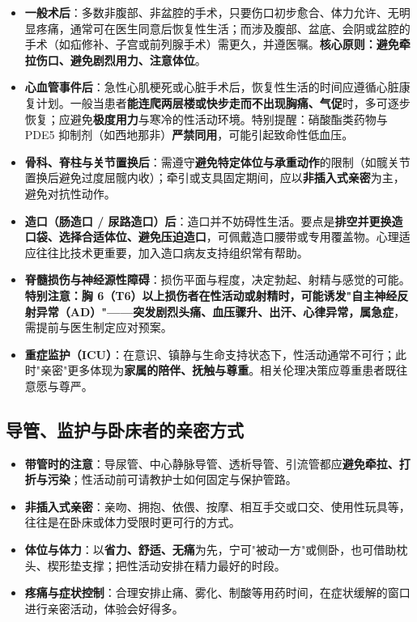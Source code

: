 \begin{itemize}
	\item \textbf{一般术后}：多数非腹部、非盆腔的手术，只要伤口初步愈合、体力允许、无明显疼痛，通常可在医生同意后恢复性生活；而涉及腹部、盆底、会阴或盆腔的手术（如疝修补、子宫或前列腺手术）需更久，并遵医嘱。\textbf{核心原则：避免牵拉伤口、避免剧烈用力、注意体位}。
	\item \textbf{心血管事件后}：急性心肌梗死或心脏手术后，恢复性生活的时间应遵循心脏康复计划。一般当患者\textbf{能连爬两层楼或快步走而不出现胸痛、气促}时，多可逐步恢复；应避免\textbf{极度用力}与寒冷的性活动环境。特别提醒：硝酸酯类药物与 PDE5 抑制剂（如西地那非）\textbf{严禁同用}，可能引起致命性低血压。
	\item \textbf{骨科、脊柱与关节置换后}：需遵守\textbf{避免特定体位与承重动作}的限制（如髋关节置换后避免过度屈髋内收）；牵引或支具固定期间，应以\textbf{非插入式亲密}为主，避免对抗性动作。
	\item \textbf{造口（肠造口 / 尿路造口）后}：造口并不妨碍性生活。要点是\textbf{排空并更换造口袋、选择合适体位、避免压迫造口}，可佩戴造口腰带或专用覆盖物。心理适应往往比技术更重要，加入造口病友支持组织常有帮助。
	\item \textbf{脊髓损伤与神经源性障碍}：损伤平面与程度，决定勃起、射精与感觉的可能。\textbf{特别注意：胸 6（T6）以上损伤者在性活动或射精时，可能诱发"自主神经反射异常（AD）"——突发剧烈头痛、血压骤升、出汗、心律异常，属急症}，需提前与医生制定应对预案。
	\item \textbf{重症监护（ICU）}：在意识、镇静与生命支持状态下，性活动通常不可行；此时"亲密"更多体现为\textbf{家属的陪伴、抚触与尊重}。相关伦理决策应尊重患者既往意愿与尊严。
\end{itemize}

\subsection{导管、监护与卧床者的亲密方式}

\begin{itemize}
	\item \textbf{带管时的注意}：导尿管、中心静脉导管、透析导管、引流管都应\textbf{避免牵拉、打折与污染}；性活动前可请教护士如何固定与保护管路。
	\item \textbf{非插入式亲密}：亲吻、拥抱、依偎、按摩、相互手交或口交、使用性玩具等，往往是在卧床或体力受限时更可行的方式。
	\item \textbf{体位与体力}：以\textbf{省力、舒适、无痛}为先，宁可"被动一方"或侧卧，也可借助枕头、楔形垫支撑；把性活动安排在精力最好的时段。
	\item \textbf{疼痛与症状控制}：合理安排止痛、雾化、制酸等用药时间，在症状缓解的窗口进行亲密活动，体验会好得多。
\end{itemize}

